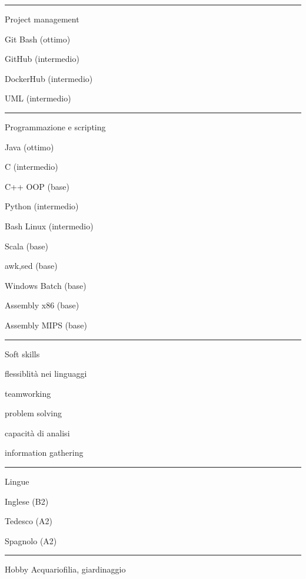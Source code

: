 \documentclass[a4paper]{letter}
\begin{document}
\begin{minipage}[t]{0.30\textwidth}
\setlength{\baselineskip}{1.5\baselineskip}
\color{white}

\vspace{2.1 mm}
\rule{\linewidth}{0.4pt}

{\large Project management}

\faCode \quad Git Bash (ottimo)

\faCode \quad GitHub (intermedio)

\faCode \quad DockerHub (intermedio)

\faCode \quad UML (intermedio)


\rule{\linewidth}{0.4pt}

{\large Programmazione e scripting}

\faCode \quad Java (ottimo)

\faCode \quad C (intermedio)

\faCode \quad C++ OOP (base)

\faCode \quad Python (intermedio)

\faCode \quad Bash Linux (intermedio)

\faCode \quad Scala (base)

\faCode \quad awk,sed (base)

\faCode \quad Windows Batch (base)

\faCode \quad Assembly x86 (base)

\faCode \quad Assembly MIPS (base)

\rule{\linewidth}{0.4pt}

{\large Soft skills}

\faCircleNotch \quad flessiblità nei linguaggi

\faCircleNotch \quad teamworking

\faCircleNotch \quad problem solving

\faCircleNotch \quad capacità di analisi

\faCircleNotch \quad information gathering

\rule{\linewidth}{0.4pt}

{\large Lingue}

\faLanguage \quad Inglese  (B2)

\faLanguage \quad Tedesco  (A2)

\faLanguage \quad Spagnolo (A2)

\rule{\linewidth}{0.4pt}

{\large Hobby}
\newline Acquariofilia, giardinaggio

\end{minipage}
\end{document}
